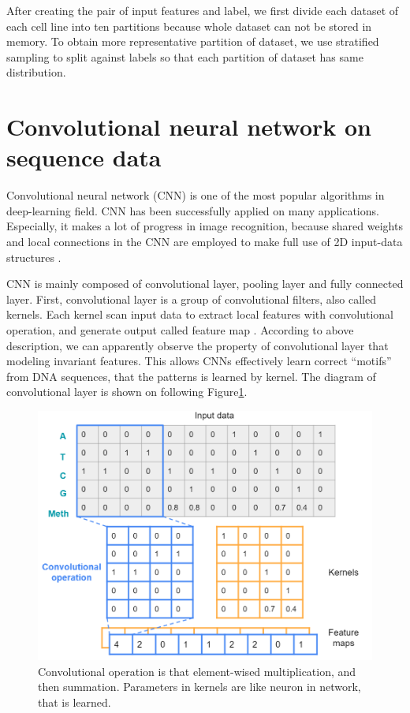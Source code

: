 After creating the pair of input features and label, we first divide each dataset of each cell line into ten partitions because whole dataset can not be stored in memory. To obtain more representative partition of dataset, we use stratified sampling to split against labels so that each partition of dataset has same distribution.

\section{Convolutional neural network on sequence data}
Convolutional neural network (CNN) is one of the most popular algorithms in deep-learning field. CNN has been successfully applied on many applications. Especially, it makes a lot of progress in image recognition, because shared weights and local connections in the CNN are employed to make full use of 2D input-data structures \cite{alzubaidi2021review}.

CNN is mainly composed of convolutional layer, pooling layer and fully connected layer. First, convolutional layer is a group of convolutional filters, also called kernels. Each kernel scan input data to extract local features with convolutional operation, and generate output called feature map \cite{alzubaidi2021review}. According to above description, we can apparently observe the property of convolutional layer that modeling invariant features. This allows CNNs effectively learn correct “motifs” from DNA sequences, that the patterns is learned by kernel. The diagram of convolutional layer is shown on following Figure\ref{f4}.

\begin{figure}[H]
    \centering
    \includegraphics[width=1\columnwidth]{body/figure/figure4.png}
    \captionsetup{labelfont=bf}
    \renewcommand{\baselinestretch}{1.0}
    \caption[Convolutional operation]{Convolutional operation is that element-wised multiplication, and then summation. Parameters in kernels are like neuron in network, that is learned.}
    \label{f4}
\end{figure}

